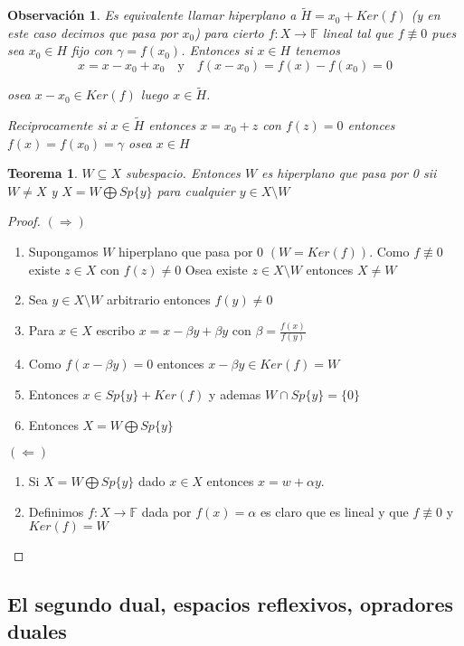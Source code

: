 \documentclass[10pt]{extarticle}
\theoremstyle{break}
\newtheorem{theorem}{Teorema}[section]
\newtheorem*{remark}{Observación}
\theoremstyle{definition}
\begin{document}
\begin{remark}
Es equivalente llamar \emph{hiperplano} a $\tilde{H}=x_{0}+Ker(f)$ (y en este caso decimos que pasa por $x_{0}$) para cierto $f : X\rightarrow \mathbb{F}$ lineal tal que $f\not\equiv 0$ pues sea $x_{0}\in H$ fijo con $\gamma=f(x_{0})$.
Entonces si $x\in H$ tenemos
$$x=x-x_{0}+x_{0}\quad\text{y}\quad f(x-x_{0})=f(x)-f(x_{0})=0$$

osea $x-x_{0}\in Ker(f)$ luego $x\in \tilde{H}$.

Reciprocamente si $x\in \tilde{H}$ entonces $x=x_{0}+z$ con $f(z)=0$ entonces $f(x)=f(x_{0})=\gamma$ osea $x\in H$

\end{remark}

\begin{theorem}
$W\subseteq X$ subespacio. Entonces $W$ es hiperplano que pasa por 0 sii $W\neq X$ y $X=W\bigoplus Sp\{ y \}$ para cualquier $y\in X\setminus W$
\end{theorem}

\begin{proof}
$(\Rightarrow)$
\begin{enumerate}
	\item Supongamos $W$ hiperplano que pasa por $0$ $(W=Ker(f))$. Como $f \not\equiv 0$ existe $z\in X$ con $f(z)\neq 0$
	Osea existe $z\in X\setminus W$ entonces $X\neq W$
	\item Sea $y\in X\setminus W$ arbitrario entonces $f(y)\neq 0$
	\item Para $x\in X$ escribo $x=x-\beta y+\beta y$ con $\beta= \frac{f(x)}{f(y)}$
	\item Como $f(x-\beta y)=0$ entonces $x-\beta y\in Ker(f)=W$
	\item Entonces $x\in Sp\{ y \}+Ker(f)$ y ademas $W\cap Sp\{ y \}=\{ 0 \}$
	\item Entonces $X=W\bigoplus Sp\{ y \}$
\end{enumerate}
$(\Leftarrow)$
\begin{enumerate}
	\item Si $X=W\bigoplus Sp\{ y \}$ dado $x\in X$ entonces $x=w+\alpha y$.
	\item Definimos $f : X\rightarrow \mathbb{F}$ dada por $f(x)=\alpha$ es claro que es lineal y que $f\not\equiv 0$ y $Ker(f)=W$
\end{enumerate}
\end{proof}

\subsection{El segundo dual, espacios reflexivos, opradores duales}
\end{document}
